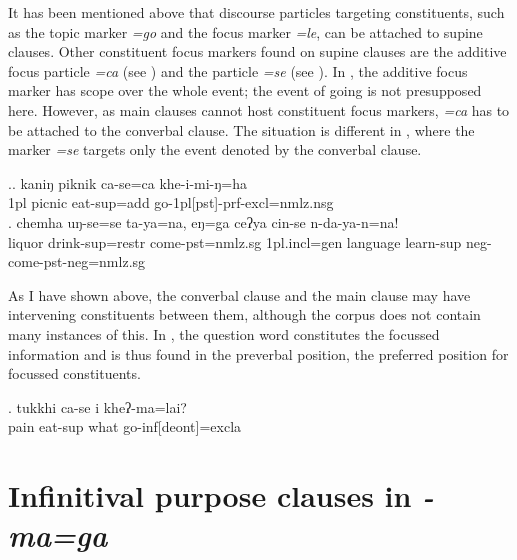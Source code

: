 It has been  mentioned above that discourse particles targeting constituents, such as the topic marker \emph{=go} and the focus marker \emph{=le}, can be attached to supine clauses. Other constituent focus markers found on supine clauses are the additive focus particle \emph{=ca}  (see \Next[a]) and the  particle \emph{=se} (see \Next[b]). In \Next[a], the additive focus marker has scope over the whole event; the event of going is not presupposed here. However, as main clauses cannot host constituent focus markers, \emph{=ca} has to be attached to the converbal clause. The situation is different in \Next[b], where the  marker \emph{=se} targets only  the event denoted by the converbal clause.

		
	\ex.\ag.      kaniŋ piknik ca-se=ca                khe-i-mi-ŋ=ha\\
		{\sc 1pl} picnic eat{\sc -sup=add} go{\sc -1pl[pst]-prf-excl=nmlz.nsg}\\
		  
	\bg. chemha uŋ-se=se ta-ya=na, eŋ=ga ceʔya cin-se n-da-ya-n=na!\\
	liquor   drink{\sc -sup=restr} come{\sc [3sg]-pst=nmlz.sg} {\sc 1pl.incl=gen} language   learn{\sc -sup} {\sc neg-}come{\sc [3sg]-pst-neg=nmlz.sg}\\
	
As I have shown above, the converbal clause and the main clause may have intervening constituents between them, although the corpus does not contain many instances of this. In \Next, the question word  constitutes the focussed information and is thus found in the preverbal position, the preferred  position for focussed constituents.

\exg.   tukkhi ca-se      i    kheʔ-ma=lai?\\
		 pain  eat{\sc -sup} what go{\sc -inf[deont]=excla}\\
		  
	

\section{Infinitival purpose clauses in \emph{-ma=ga}}\label{maga}


